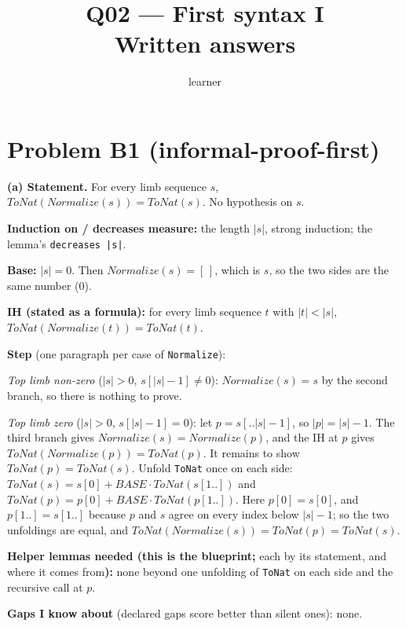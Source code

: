 \documentclass[11pt]{article}
\title{Q02 --- First syntax I \\ \large Written answers}
\author{learner}
\date{}
\begin{document}
\maketitle

\section*{Problem B1 (informal-proof-first)}\label{ans:B1}
\begin{answer}
\textbf{(a) Statement.} For every limb sequence $s$,
$\mathit{ToNat}(\mathit{Normalize}(s)) = \mathit{ToNat}(s)$. No hypothesis on
$s$.

\textbf{Induction on / decreases measure:} the length $|s|$, strong induction;
the lemma's \texttt{decreases |s|}.

\textbf{Base:} $|s| = 0$. Then $\mathit{Normalize}(s) = [\,]$, which is $s$,
so the two sides are the same number (0).

\textbf{IH (stated as a formula):} for every limb sequence $t$ with
$|t| < |s|$, $\mathit{ToNat}(\mathit{Normalize}(t)) = \mathit{ToNat}(t)$.

\textbf{Step} (one paragraph per case of \texttt{Normalize}):

\emph{Top limb non-zero} ($|s| > 0$, $s[|s|-1] \neq 0$):
$\mathit{Normalize}(s) = s$ by the second branch, so there is nothing to prove.

\emph{Top limb zero} ($|s| > 0$, $s[|s|-1] = 0$): let $p = s[..|s|-1]$, so
$|p| = |s| - 1$. The third branch gives $\mathit{Normalize}(s) =
\mathit{Normalize}(p)$, and the IH at $p$ gives
$\mathit{ToNat}(\mathit{Normalize}(p)) = \mathit{ToNat}(p)$. It remains to show
$\mathit{ToNat}(p) = \mathit{ToNat}(s)$. Unfold \texttt{ToNat} once on each
side: $\mathit{ToNat}(s) = s[0] + \mathit{BASE} \cdot \mathit{ToNat}(s[1..])$
and $\mathit{ToNat}(p) = p[0] + \mathit{BASE} \cdot \mathit{ToNat}(p[1..])$.
Here $p[0] = s[0]$, and $p[1..] = s[1..]$ because $p$ and $s$ agree on every
index below $|s| - 1$; so the two unfoldings are equal, and
$\mathit{ToNat}(\mathit{Normalize}(s)) = \mathit{ToNat}(p) = \mathit{ToNat}(s)$.

\textbf{Helper lemmas needed (this is the blueprint;} each by its statement,
and where it comes from\textbf{):} none beyond one unfolding of \texttt{ToNat}
on each side and the recursive call at $p$.

\textbf{Gaps I know about} (declared gaps score better than silent ones):
none.


\end{answer}
\end{document}
